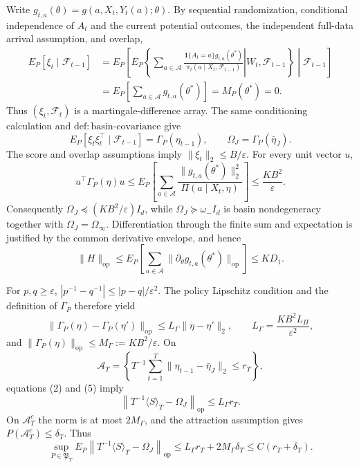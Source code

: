 Write \(g_{t,a}(\theta)=g(a,X_t,Y_t(a);\theta)\). By sequential randomization, conditional independence of \(A_t\) and the current potential outcomes, the independent full-data arrival assumption, and overlap,
\[
\begin{aligned}
 E_P[\xi_t\mid\mathcal F_{t-1}]
 &=E_P\!\left[E_P\!\left\{\left.\sum_{a\in\mathcal A}
 \frac{\mathbf1\{A_t=a\}g_{t,a}(\theta^*)}
 {\pi_t(a\mid X_t,\mathcal F_{t-1})}\right|W_t,\mathcal F_{t-1}\right\}\middle|\mathcal F_{t-1}\right]\nonumber\\
 &=E_P\!\left[\sum_{a\in\mathcal A}g_{t,a}(\theta^*)\right]
 =M_P(\theta^*)=0.
\end{aligned}\tag{1}
\]
Thus \((\xi_t,\mathcal F_t)\) is a martingale-difference array. The same conditioning calculation and \(\mathrm{def:basin\text{-}covariance}\) give
\[
 E_P[\xi_t\xi_t^\top\mid\mathcal F_{t-1}]=\Gamma_P(\eta_{t-1}),
 \qquad \Omega_J=\Gamma_P(\bar\eta_J). \tag{2}
\]
The score and overlap assumptions imply \(\|\xi_t\|_2\le B/\varepsilon\). For every unit vector \(u\),
\[
 u^\top\Gamma_P(\eta)u
 \le E_P\!\left[\sum_{a\in\mathcal A}
 \frac{\|g_{t,a}(\theta^*)\|_2^2}{\Pi(a\mid X_t,\eta)}\right]
 \le\frac{KB^2}{\varepsilon}. \tag{3}
\]
Consequently \(\Omega_J\preceq(KB^2/\varepsilon)I_d\), while \(\Omega_J\succeq\omega_-I_d\) is basin nondegeneracy together with \(\Omega_J=\Omega_\infty\). Differentiation through the finite sum and expectation is justified by the common derivative envelope, and hence
\[
 \|H\|_{\mathrm{op}}
 \le E_P\!\left[\sum_{a\in\mathcal A}
 \|\partial_\theta g_{t,a}(\theta^*)\|_{\mathrm{op}}\right]
 \le KD_1. \tag{4}
\]

For \(p,q\ge\varepsilon\), \(|p^{-1}-q^{-1}|\le|p-q|/\varepsilon^2\). The policy Lipschitz condition and the definition of \(\Gamma_P\) therefore yield
\[
 \|\Gamma_P(\eta)-\Gamma_P(\eta')\|_{\mathrm{op}}
 \le L_\Gamma\|\eta-\eta'\|_2,
 \qquad L_\Gamma=\frac{KB^2L_\Pi}{\varepsilon^2}, \tag{5}
\]
and \(\|\Gamma_P(\eta)\|_{\mathrm{op}}\le M_\Gamma:=KB^2/\varepsilon\). On
\[
 \mathcal A_T=\left\{T^{-1}\sum_{t=1}^T
 \|\eta_{t-1}-\bar\eta_J\|_2\le r_T\right\},
\]
equations (2) and (5) imply
\[
 \left\|T^{-1}\langle S\rangle_T-\Omega_J\right\|_{\mathrm{op}}
 \le L_\Gamma r_T. \tag{6}
\]
On \(\mathcal A_T^c\) the norm is at most \(2M_\Gamma\), and the attraction assumption gives \(P(\mathcal A_T^c)\le\delta_T\). Thus
\[
 \sup_{P\in\mathfrak P_T}E_P\left\|T^{-1}\langle S\rangle_T-\Omega_J\right\|_{\mathrm{op}}
 \le L_\Gamma r_T+2M_\Gamma\delta_T
 \le C(r_T+\delta_T). \tag{7}
\]

